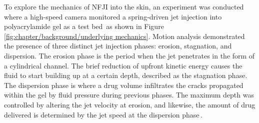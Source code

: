         To explore the mechanics of NFJI into the skin, an experiment was conducted where a high-speed camera monitored a spring-driven jet injection into polyacrylamide gel as a test bed\,\cite{Schramm-Baxter2004b} as shown in Figure\,\ref{fig:chapter/background/underlying mechanics}. Motion analysis demonstrated the presence of three distinct jet injection phases: erosion, stagnation, and dispersion. The erosion phase is the period when the jet penetrates in the form of a cylindrical channel. The brief reduction of upfront kinetic energy causes the fluid to start building up at a certain depth, described as the stagnation phase. The dispersion phase is where a drug volume infiltrates the cracks propagated within the gel by fluid pressure during previous phases. The maximum depth was controlled by altering the jet velocity at erosion, and likewise, the amount of drug delivered is determined by the jet speed at the dispersion phase\,\cite{Stachowiak2009}.
        
